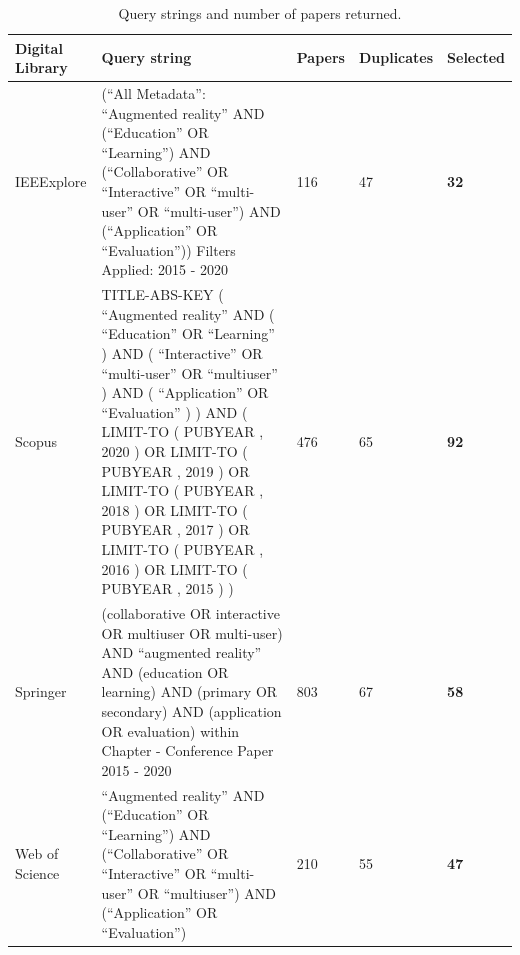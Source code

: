 \begin{table}[htbp]
\centering
\caption {Query strings and number of papers returned.}\label{tab:searchstring}
\begin{tabular}{|M{2cm}||M{8.5cm}|M{1.25cm}|M{1.65cm}|M{1.3cm}|}
    \hline
         \textbf{Digital Library} & \textbf{Query string} & \textbf{Papers} & \textbf{Duplicates} & \textbf{Selected} \\
    \hline
    \hline
         IEEExplore    &  (``All Metadata'': ``Augmented reality'' AND (``Education'' OR ``Learning'') AND (``Collaborative'' OR ``Interactive'' OR ``multi-user'' OR ``multi-user'') AND (``Application'' OR ``Evaluation'')) Filters Applied: 2015 - 2020 & 116 & 47 & \textbf{32} \\
    \hline
        Scopus         & TITLE-ABS-KEY ( ``Augmented reality''  AND  ( ``Education''  OR  ``Learning'' )  AND  ( ``Interactive''  OR  ``multi-user''  OR  ``multiuser'' )  AND  ( ``Application''  OR  ``Evaluation'' ) )  AND  ( LIMIT-TO ( PUBYEAR ,  2020 )  OR  LIMIT-TO ( PUBYEAR ,  2019 )  OR  LIMIT-TO ( PUBYEAR ,  2018 )  OR  LIMIT-TO ( PUBYEAR ,  2017 )  OR  LIMIT-TO ( PUBYEAR ,  2016 )  OR  LIMIT-TO ( PUBYEAR ,  2015 ) )    & 476 & 65 & \textbf{92} \\
    \hline
        Springer       & (collaborative OR interactive OR multiuser OR multi-user) AND ``augmented reality'' AND (education OR learning) AND (primary OR secondary) AND (application OR evaluation)
within Chapter - Conference Paper  2015 - 2020  & 803 & 67 & \textbf{58} \\
    \hline
        Web of Science & ``Augmented reality'' AND (``Education'' OR ``Learning'') AND (``Collaborative'' OR ``Interactive'' OR ``multi-user'' OR ``multiuser'') AND (``Application'' OR ``Evaluation'') & 210 & 55 & \textbf{47} \\
    \hline

\end{tabular}
\end{table}
